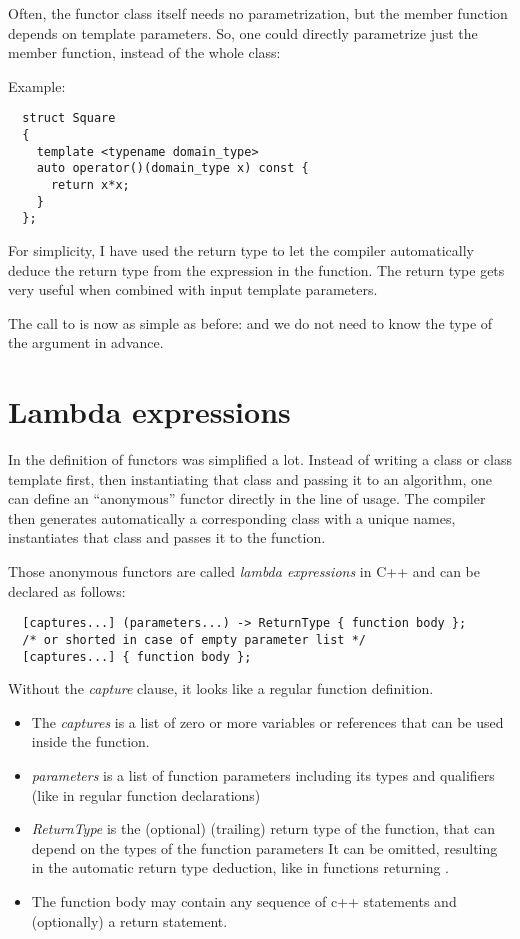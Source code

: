Often, the functor class itself needs no parametrization, but the member function  depends on template parameters. So,
one could directly parametrize just the member function, instead of the whole class:

Example:
\begin{verbatim}
  struct Square
  {
    template <typename domain_type>
    auto operator()(domain_type x) const {
      return x*x;
    }
  };
\end{verbatim}
%
For simplicity, I have used the return type  to let the compiler automatically deduce the return type from the expression in the
function. The  return type gets very useful when combined with input template parameters.

The call to  is now as simple as before:
and we do not need to know the type of the argument in advance.


\section{Lambda expressions}
In \marginpar{[\cxx{11}]} the definition of functors was simplified a lot. Instead of writing a class or class template first, then instantiating that
class and passing it to an algorithm, one can define an ``anonymous'' functor directly in the line of usage. The compiler then generates automatically
a corresponding class with a unique names, instantiates that class and passes it to the function.

Those anonymous functors are called \emph{lambda expressions} in C++ and can be declared as follows:
%
\begin{verbatim}
  [captures...] (parameters...) -> ReturnType { function body };
  /* or shorted in case of empty parameter list */
  [captures...] { function body };
\end{verbatim}
%
Without the \emph{capture} clause, it looks like a regular function definition.
\begin{itemize}
  \item The \emph{captures} is a list of zero or more variables or references that can be used inside the function.
  \item \emph{parameters} is a list of function parameters including its types and qualifiers (like in regular function declarations)
  \item \emph{ReturnType} is the (optional) (trailing) return type of the function, that can depend on the types of the function parameters
        It can be omitted, resulting in the automatic return type deduction, like in functions returning .
  \item The function body may contain any sequence of c++ statements and (optionally) a return statement.
\end{itemize}

